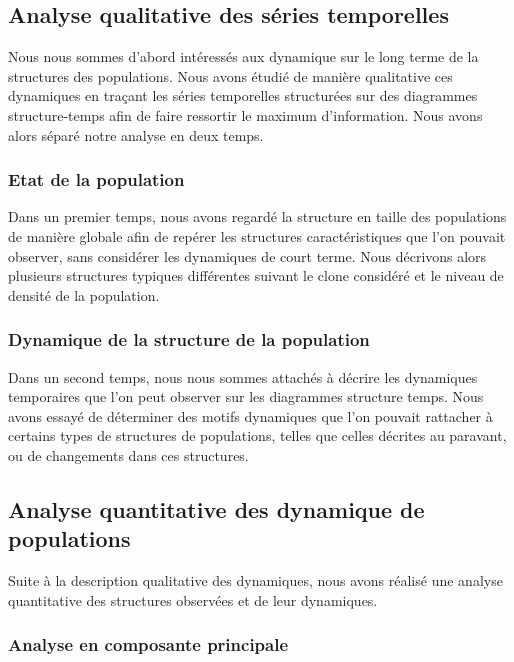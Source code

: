 \subsection{Analyse qualitative des séries temporelles}

Nous nous sommes d'abord intéressés aux dynamique sur le long
terme de la structures des populations. Nous avons étudié de manière
qualitative ces dynamiques en traçant les séries temporelles structurées sur des
diagrammes structure-temps afin de faire ressortir le maximum d'information.
Nous avons alors séparé notre analyse en deux temps.

\subsubsection{Etat de la population}

Dans un premier temps, nous avons regardé la structure en taille des populations
de manière globale afin de repérer les structures caractéristiques que l'on
pouvait observer, sans considérer les dynamiques de court terme. Nous décrivons
alors plusieurs structures typiques différentes suivant le clone considéré et le
niveau de densité de la population.

\subsubsection{Dynamique de la structure de la population}

Dans un second temps, nous nous sommes attachés à décrire les dynamiques
temporaires que l'on peut observer sur les diagrammes structure temps. Nous
avons essayé de déterminer des motifs dynamiques que l'on pouvait rattacher à
certains types de structures de populations, telles que celles décrites au
paravant, ou de changements dans ces structures.

\subsection{Analyse quantitative des dynamique de populations}

Suite à la description qualitative des dynamiques, nous avons réalisé une
analyse quantitative des structures observées et de leur dynamiques. 

\subsubsection{Analyse en composante principale}

